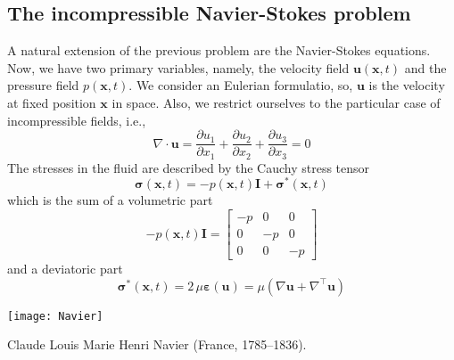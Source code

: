 \subsection{The incompressible Navier-Stokes problem}

A natural extension of the previous problem are
the Navier-Stokes equations. Now, we have two primary variables,
namely, the velocity field $\mathbf{u}(\mathbf{x},t)$ and
the pressure field $p(\mathbf{x},t)$. We consider
an Eulerian formulatio, so, $\mathbf{u}$ is
the velocity at fixed position $\mathbf{x}$ in space.
Also, we restrict ourselves to the particular case
of incompressible fields, i.e.,
\begin{equation}
\nabla \cdot \mathbf{u} = \frac{\partial{u_1}}{\partial{x_1}} + \frac{\partial{u_2}}{\partial{x_2}} + \frac{\partial{u_3}}{\partial{x_3}} = 0
\end{equation}
The stresses in the fluid are described by the Cauchy stress tensor 
\begin{equation}
\boldsymbol{\sigma}(\mathbf{x},t) = -p(\mathbf{x},t) \mathbf{I} + \boldsymbol{\sigma}^*(\mathbf{x},t)
\end{equation}
which is the sum of a volumetric part 
\begin{equation}
-p(\mathbf{x},t) \mathbf{I} = 
\begin{bmatrix}
-p & 0 & 0 \\
0 & -p & 0 \\
0 & 0 & -p
\end{bmatrix}
\end{equation}
and a deviatoric part
\begin{equation}
\boldsymbol{\sigma}^*(\mathbf{x},t)= 2 \, \mu \boldsymbol{\varepsilon}(\mathbf{u}) =
\mu \left (\nabla{\mathbf{u}} + \nabla^{\intercal}{\mathbf{u}} \right)
\end{equation}
\begin{marginfigure}[-3.0cm]
	\texttt{[image: Navier]}
	\caption[]{Claude Louis Marie Henri Navier (France, 1785--1836).} 
\end{marginfigure}
